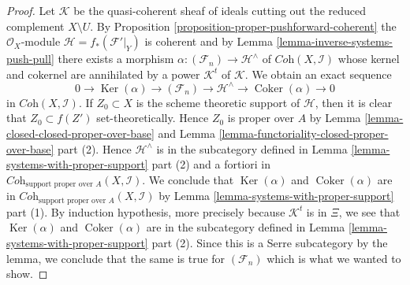 \documentclass{stacks-project}
\theoremstyle{plain}
\theoremstyle{definition}
\theoremstyle{remark}
\numberwithin{equation}{subsection}
\def\Ker{\mathop{\mathrm{Ker}}}
\def\Coker{\mathop{\mathrm{Coker}}}
\begin{document}
\begin{proof}
\medskip\noindent
Let $\mathcal{K}$ be the quasi-coherent sheaf of ideals cutting
out the reduced complement $X \setminus U$. By
Proposition \ref{proposition-proper-pushforward-coherent}
the $\mathcal{O}_X$-module $\mathcal{H} = f_*(\mathcal{F}'|_Y)$ is coherent
and by Lemma \ref{lemma-inverse-systems-push-pull}
there exists a morphism $\alpha : (\mathcal{F}_n) \to \mathcal{H}^\wedge$
of $\textit{Coh}(X, \mathcal{I})$ whose kernel and cokernel are
annihilated by a power $\mathcal{K}^t$ of $\mathcal{K}$.
We obtain an exact sequence
$$
0 \to \Ker(\alpha) \to (\mathcal{F}_n) \to
\mathcal{H}^\wedge \to \Coker(\alpha) \to 0
$$
in $\textit{Coh}(X, \mathcal{I})$. If $Z_0 \subset X$ is the scheme theoretic
support of $\mathcal{H}$, then it is clear that $Z_0 \subset f(Z')$
set-theoretically. Hence $Z_0$ is proper over $A$ by
Lemma \ref{lemma-closed-closed-proper-over-base} and
Lemma \ref{lemma-functoriality-closed-proper-over-base} part (2).
Hence $\mathcal{H}^\wedge$ is in the subcategory defined in
Lemma \ref{lemma-systems-with-proper-support} part (2)
and a fortiori in
$\textit{Coh}_{\text{support proper over }A}(X, \mathcal{I})$.
We conclude that $\Ker(\alpha)$ and $\Coker(\alpha)$
are in $\textit{Coh}_{\text{support proper over }A}(X, \mathcal{I})$
by Lemma \ref{lemma-systems-with-proper-support} part (1).
By induction hypothesis, more precisely because $\mathcal{K}^t$ is in $\Xi$,
we see that $\Ker(\alpha)$ and $\Coker(\alpha)$ are in
the subcategory defined in
Lemma \ref{lemma-systems-with-proper-support} part (2).
Since this is a Serre subcategory by the lemma, we conclude that the
same is true for $(\mathcal{F}_n)$ which is what we wanted to show.
\end{proof}
\end{document}
